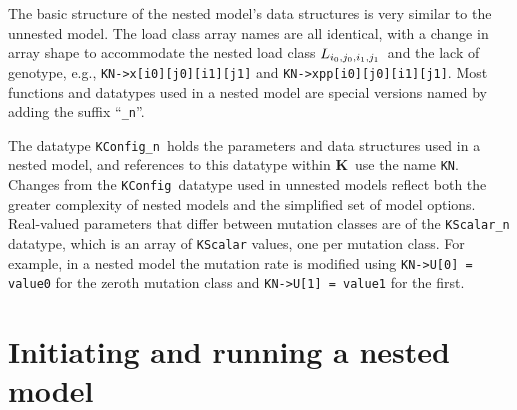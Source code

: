 \documentclass[12pt,twoside,letterpaper,fleqn]{report}
\numberwithin{equation}{section}  %
\newcommand{\K}{{\bf K}}
\newcommand{\KKN}{\mbox{{\tt KN}}}  %
\newcommand{\KConfig}{\mbox{\tt KConfig}}
\newcommand{\KConfign}{\mbox{\tt KConfig\_n}}
\newcommand{\Lijij}{\mbox{$L_{i_0\/,j_0\/,i_1\/,j_1\/}$}}
\begin{document}
{The basic structure of the nested model's data structures is very similar to the unnested model.  The load class array names are all identical, with a change in array shape to accommodate the nested load class \Lijij\ and the lack of genotype, e.g., \lstinline{KN->x[i0][j0][i1][j1]} and \lstinline{KN->xpp[i0][j0][i1][j1]}.  Most functions and datatypes used in a nested model are special versions named by adding the suffix ``\lstinline{_n}''. 

The datatype \KConfign\ holds the parameters and data structures used in a nested model, and references to this datatype within \K\ use the name \KKN.  Changes from the \KConfig\ datatype used in unnested models reflect both the greater complexity of nested models and the simplified set of model options.
Real-valued parameters that differ between mutation classes are of the \lstinline{KScalar_n} datatype, which is an array of \lstinline{KScalar} values, one per mutation class.  For example, in a nested model the mutation rate is modified using \lstinline{KN->U[0] = value0} for the zeroth mutation class and \lstinline{KN->U[1] = value1} for the first.

\section{Initiating and running a nested model}

}
\end{document}
